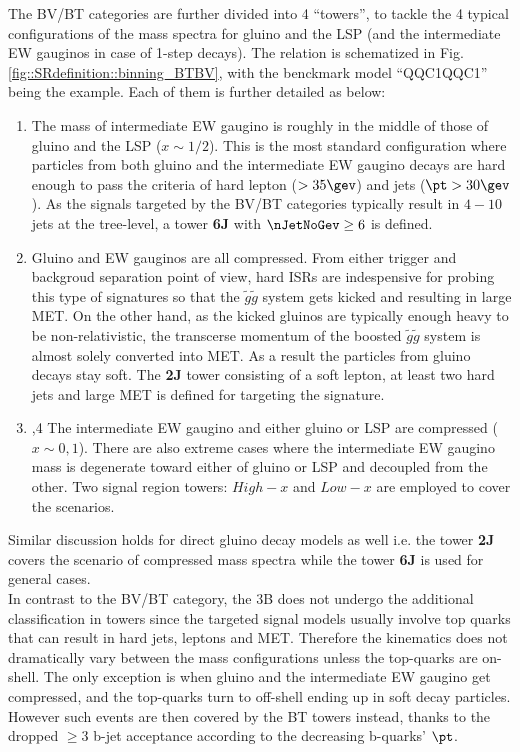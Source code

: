 \clearpage
The BV/BT categories are further divided into 4 ``towers'', to tackle the 4 typical configurations of the mass spectra for gluino and the LSP (and the intermediate EW gauginos in case of 1-step decays). The relation is schematized in Fig. \ref{fig::SRdefinition::binning_BTBV}, with the benckmark model ``QQC1QQC1'' being the example.
Each of them is further detailed as below:

\begin{enumerate}
\item The mass of intermediate EW gaugino is roughly in the middle of those of gluino and the LSP ($x \sim 1/2$).
This is the most standard configuration where particles from both gluino and the intermediate EW gaugino decays are hard enough to pass the criteria of hard lepton ($>35\gev$) and jets ($\pt>30\gev$). As the signals targeted by the BV/BT categories typically result in $4-10$ jets at the tree-level, a tower \textbf{6J} with $\nJetNoGev \geq 6$ is defined. 

\item Gluino and EW gauginos are all compressed. 
From either trigger and backgroud separation point of view, hard ISRs are indespensive for probing this type of signatures so that the $\tilde{g}\tilde{g}$ system gets kicked and resulting in large MET. On the other hand, as the kicked gluinos are typically enough heavy to be non-relativistic, the transcerse momentum of the boosted $\tilde{g}\tilde{g}$ system is almost solely converted into MET. As a result the particles from gluino decays stay soft. The \textbf{2J} tower consisting of a soft lepton, at least two hard jets and large MET is defined for targeting the signature.

\item,4 The intermediate EW gaugino and either gluino or LSP are compressed ($x \sim 0, 1$). 
There are also extreme cases where the intermediate EW gaugino mass is degenerate toward either of gluino or LSP and decoupled from the other. Two signal region towers: \textbf{$High-x$} and \textbf{$Low-x$} are employed to cover the scenarios. 
\end{enumerate}

Similar discussion holds for direct gluino decay models as well i.e. the tower \textbf{2J} covers the scenario of compressed mass spectra while the tower \textbf{6J} is used for general cases. \\

In contrast to the BV/BT category, the 3B does not undergo the additional classification in towers since the targeted signal models usually involve top quarks that can result in hard jets, leptons and MET. 
Therefore the kinematics does not dramatically vary between the mass configurations unless the top-quarks are on-shell.
The only exception is when gluino and the intermediate EW gaugino get compressed, and the top-quarks turn to off-shell ending up in soft decay particles.
However such events are then covered by the BT towers instead, thanks to the dropped $\geq 3$ b-jet acceptance according to the decreasing b-quarks' $\pt$. \\ 


